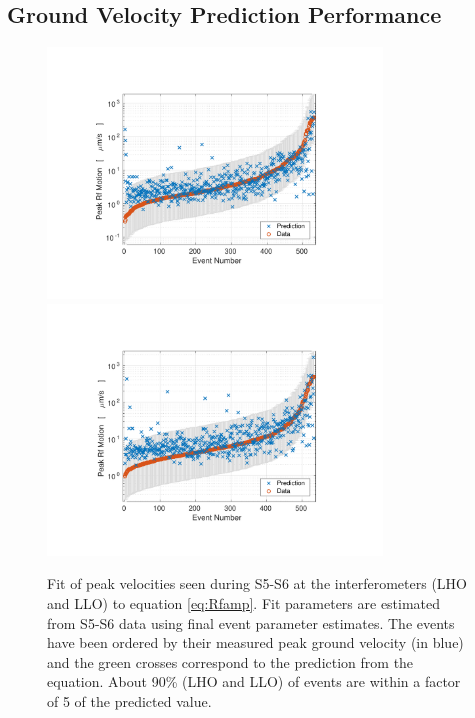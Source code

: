 \documentclass[twocolumn, aps, superscriptaddress]{revtex4}
\begin{document}
\subsection{Ground Velocity Prediction Performance}

\begin{figure}[t]
\hspace*{-0.5cm}
 \includegraphics[width=3.5in,trim = 2.5cm 1.5cm 2.5cm 1.5cm, clip=true]{Prediction_LHO_S5_S6.pdf}
 \includegraphics[width=3.5in,trim = 2.5cm 1.5cm 2.5cm 1.5cm, clip=true]{Prediction_LLO_S5_S6.pdf}
 \caption{Fit of peak velocities seen during S5-S6 at the interferometers (LHO and LLO) to equation \ref{eq:Rfamp}.  Fit parameters are estimated from S5-S6 data using final event parameter estimates. The events have been ordered by their measured peak ground velocity (in blue) and the green crosses correspond to the prediction from the equation. About 90\% (LHO and LLO) of events are within a factor of 5 of the predicted value.}
 \label{fig:regression}
\end{figure}
\end{document}
